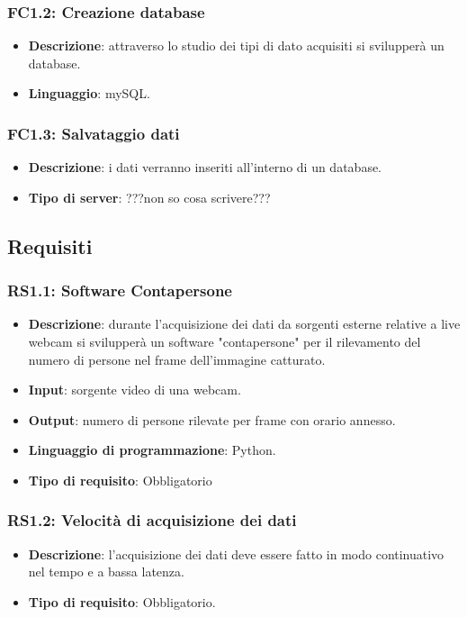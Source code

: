 \subsubsection{FC1.2: Creazione database}

\begin{itemize}
	\item \textbf{Descrizione}: attraverso lo studio dei tipi di dato acquisiti si svilupperà un database.
	\item \textbf{Linguaggio}: mySQL.
\end{itemize}

\subsubsection{FC1.3: Salvataggio dati}

\begin{itemize}
	\item \textbf{Descrizione}: i dati verranno inseriti all'interno di un database.
	\item \textbf{Tipo di server}: ???non so cosa scrivere???
\end{itemize}

\subsection{Requisiti}

\subsubsection{RS1.1: Software Contapersone}%

\begin{itemize}
	\item \textbf{Descrizione}: durante l'acquisizione dei dati da sorgenti esterne relative a live webcam si svilupperà un software "contapersone" per il rilevamento del numero di persone nel frame dell'immagine catturato.
	\item \textbf{Input}: sorgente video di una webcam.
	\item \textbf{Output}: numero di persone rilevate per frame con orario annesso.
	\item \textbf{Linguaggio di programmazione}: Python.
	\item \textbf{Tipo di requisito}: Obbligatorio   
\end{itemize}

\subsubsection{RS1.2: Velocità di acquisizione dei dati}
\begin{itemize}
	\item \textbf{Descrizione}: l'acquisizione dei dati deve essere fatto in modo continuativo nel tempo e a bassa latenza.
	\item \textbf{Tipo di requisito}: Obbligatorio.
\end{itemize}

